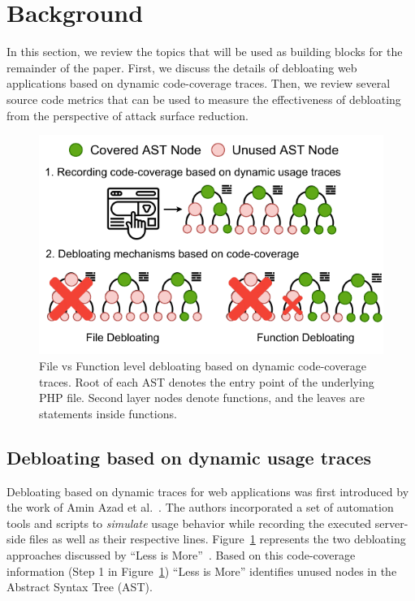\section{Background}

In this section, we review the topics that will be used as building blocks for the remainder of the paper. 
First, we discuss the details of debloating web applications based on dynamic code-coverage traces. 
Then, we review several source code metrics that can be used to measure the effectiveness of debloating from the perspective of attack surface reduction.

\begin{figure}[t]
    \centering
    \includegraphics[width=0.75\columnwidth]{figures/dbltr/file_vs_function_debloating.drawio.pdf}
    \caption{File vs Function level debloating based on dynamic code-coverage traces. Root of each AST denotes the entry point of the underlying PHP file. Second layer nodes denote functions, and the leaves are statements inside functions.}
    \label{fig:file_vs_func_debloating}
\end{figure}

\subsection{Debloating based on dynamic usage traces}
Debloating based on dynamic traces for web applications was first introduced by the work of Amin Azad et al.~\cite{lessismore}. 
The authors incorporated a set of automation tools and scripts to \emph{simulate} usage behavior while recording the executed server-side files as well as their respective lines.
Figure~\ref{fig:file_vs_func_debloating} represents the two debloating approaches discussed by ``Less is More''~\cite{lessismore}. 
Based on this code-coverage information (Step 1 in Figure~\ref{fig:file_vs_func_debloating}) ``Less is More'' identifies unused nodes in the Abstract Syntax Tree (AST). 

